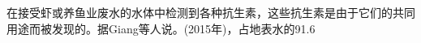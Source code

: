 \documentclass{SCIS2020cn}
\begin{document}
在接受虾或养鱼业废水的水体中检测到各种抗生素，这些抗生素是由于它们的共同用途而被发现的。据Giang等人说。(2015年)，占地表水的91.6%
\end{document}
